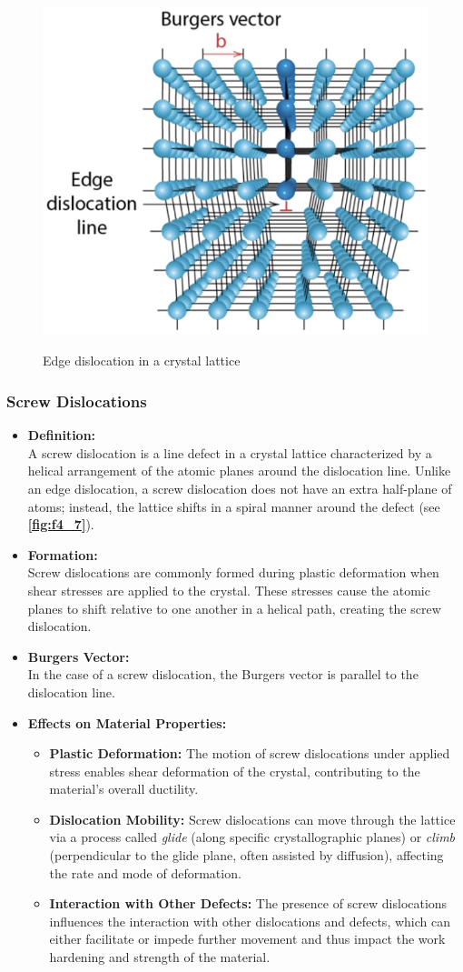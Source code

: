 \begin{figure}[ht]
  \centering
  \caption{Edge dislocation in a crystal lattice}
  \includegraphics[width=0.35\linewidth]{./figures/f4_6.png}
  \label{fig:f4_6}
\end{figure}


\subsubsection{Screw Dislocations}
\begin{itemize}
  \item \textbf{Definition:} \\
    A screw dislocation is a line defect in a crystal lattice characterized by a helical arrangement of the atomic planes around the dislocation line. Unlike an edge dislocation, a screw dislocation does not have an extra half-plane of atoms; instead, the lattice shifts in a spiral manner around the defect (see \textbf{\autoref{fig:f4_7}}).
  \item \textbf{Formation:} \\
    Screw dislocations are commonly formed during plastic deformation when shear stresses are applied to the crystal. These stresses cause the atomic planes to shift relative to one another in a helical path, creating the screw dislocation.
  \item \textbf{Burgers Vector:} \\
    In the case of a screw dislocation, the Burgers vector is parallel to the dislocation line.
  \item \textbf{Effects on Material Properties:}
    \begin{itemize}
      \item \textbf{Plastic Deformation:} The motion of screw dislocations under applied stress enables shear deformation of the crystal, contributing to the material's overall ductility.
      \item \textbf{Dislocation Mobility:} Screw dislocations can move through the lattice via a process called \textit{glide} (along specific crystallographic planes) or \textit{climb} (perpendicular to the glide plane, often assisted by diffusion), affecting the rate and mode of deformation.
      \item \textbf{Interaction with Other Defects:} The presence of screw dislocations influences the interaction with other dislocations and defects, which can either facilitate or impede further movement and thus impact the work hardening and strength of the material.
    \end{itemize}
\end{itemize}

